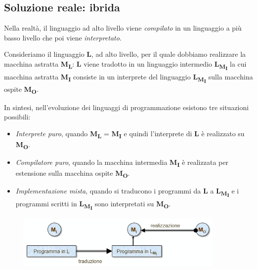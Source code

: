\documentclass[a4paper,oneside,titlepage]{book}
\begin{document}
\subsection{Soluzione reale: ibrida}
Nella realtà, il linguaggio ad alto livello viene \textit{compilato} in un linguaggio a più basso livello che poi viene \textit{interpretato}.

Consideriamo il linguaggio \textbf{L}, ad alto livello, per il quale dobbiamo realizzare la macchina astratta \textbf{M\textsubscript{L}}: \textbf{L} viene tradotto in un linguaggio intermedio \textbf{L\textsubscript{M\textsubscript{I}}} la cui macchina astratta \textbf{M\textsubscript{I}} consiste in un interprete del linguaggio \textbf{L\textsubscript{M\textsubscript{I}}} sulla macchina ospite \textbf{M\textsubscript{O}}. 

In sintesi, nell'evoluzione dei linguaggi di programmazione esistono tre situazioni possibili:
\begin{itemize}
	\item \textit{Interprete puro}, quando \textbf{M\textsubscript{L}} = \textbf{M\textsubscript{I}} e quindi l'interprete di \textbf{L} è realizzato su \textbf{M\textsubscript{O}}.
	\item \textit{Compilatore puro}, quando la macchina intermedia \textbf{M\textsubscript{I}} è realizzata per estensione sulla macchina ospite \textbf{M\textsubscript{O}}.
	\item \textit{Implementazione mista}, quando si traducono i programmi da \textbf{L} a \textbf{L\textsubscript{M\textsubscript{I}}} e i programmi scritti in \textbf{L\textsubscript{M\textsubscript{I}}} sono interpretati su \textbf{M\textsubscript{O}}.
\end{itemize}
\begin{figure}[htp]
	\centering
	\includegraphics[width=0.9\textwidth, height=0.9\textheight, keepaspectratio]{ibrida.png}
\end{figure}
\end{document}

